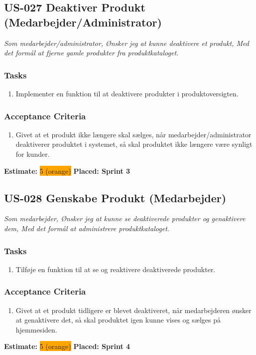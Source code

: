 \subsection{US-027 Deaktiver Produkt (Medarbejder/Administrator)}
\label{sec:US-027}
\textit{Som medarbejder/administrator, Ønsker jeg at kunne deaktivere et produkt, Med det formål at fjerne gamle produkter fra produktkataloget.}
\subsubsection*{\textbf{Tasks}}
\begin{enumerate}
  \item Implementer en funktion til at deaktivere produkter i produktoversigten.
\end{enumerate}
\subsubsection*{\textbf{Acceptance Criteria}}
\begin{enumerate}
  \item Givet at et produkt ikke længere skal sælges, når medarbejder/administrator deaktiverer produktet i systemet, så skal produktet ikke længere være synligt for kunder.
\end{enumerate}
\textbf{Estimate:} \colorbox{orange}{5 (orange)}
\textbf{Placed: Sprint 3}
\par\noindent\dotfill

\subsection{US-028 Genskabe Produkt (Medarbejder)}
\label{sec:US-028}
\textit{Som medarbejder, Ønsker jeg at kunne se deaktiverede produkter og genaktivere dem, Med det formål at administrere produktkataloget.}
\subsubsection*{\textbf{Tasks}}
\begin{enumerate}
  \item Tilføje en funktion til at se og reaktivere deaktiverede produkter.
\end{enumerate}
\subsubsection*{\textbf{Acceptance Criteria}}
\begin{enumerate}
  \item Givet at et produkt tidligere er blevet deaktiveret, når medarbejderen ønsker at genaktivere det, så skal produktet igen kunne vises og sælges på hjemmesiden.
\end{enumerate}
\textbf{Estimate:} \colorbox{orange}{5 (orange)}
\textbf{Placed: Sprint 4}
\par\noindent\dotfill

